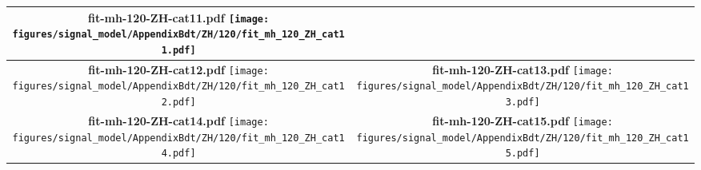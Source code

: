 \begin{longtable}{|c|c|}
{\centering
{\bfseries fit-mh-120-ZH-cat11.pdf}
\texttt{[image: figures/signal\_model/AppendixBdt/ZH/120/fit\_mh\_120\_ZH\_cat11.pdf]}
}
 \\
\hline
\parbox{0.47\textwidth}{
\centering
{\bfseries fit-mh-120-ZH-cat12.pdf}
\texttt{[image: figures/signal\_model/AppendixBdt/ZH/120/fit\_mh\_120\_ZH\_cat12.pdf]}
}
 & \parbox{0.47\textwidth}{
\centering
{\bfseries fit-mh-120-ZH-cat13.pdf}
\texttt{[image: figures/signal\_model/AppendixBdt/ZH/120/fit\_mh\_120\_ZH\_cat13.pdf]}
}
 \\
\hline
\parbox{0.47\textwidth}{
\centering
{\bfseries fit-mh-120-ZH-cat14.pdf}
\texttt{[image: figures/signal\_model/AppendixBdt/ZH/120/fit\_mh\_120\_ZH\_cat14.pdf]}
}
 & \parbox{0.47\textwidth}{
\centering
{\bfseries fit-mh-120-ZH-cat15.pdf}
\texttt{[image: figures/signal\_model/AppendixBdt/ZH/120/fit\_mh\_120\_ZH\_cat15.pdf]}
}
 \\
\hline
\end{longtable}
